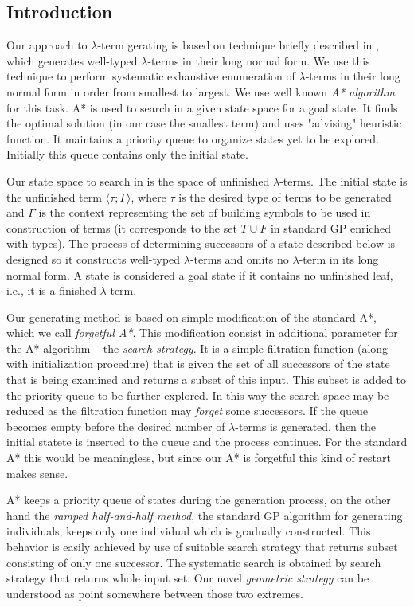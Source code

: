 \documentclass[conference]{IEEEtran}
\newcommand{\lterm}{$\lambda$-term\xspace}
\newcommand{\lterms}{$\lambda$-terms\xspace}
\newcommand{\ul}[2]{\langle #1 ; #2 \rangle}
\begin{document}
\subsection{Introduction}

Our approach to \lterm gerating is based on technique 
briefly described in \cite{barendregt10}, which generates
well-typed \lterms in their long normal form. 
We use this technique to perform systematic exhaustive enumeration
of \lterms in their long normal form in order from smallest to largest.
We use well known \textit{A* algorithm} \cite{AIMA} for this task.
A* is used to search in a given state space for a goal state. 
It finds the optimal solution (in our case the smallest term)
and uses "advising" heuristic function.
It maintains a priority queue to organize states yet to be explored.
Initially this queue contains only the initial state.  

Our state space to search in is the space of unfinished \lterms. 
The initial state is the unfinished term $\ul{\tau}{\Gamma}$, 
where $\tau$ is the desired type of
terms to be generated and $\Gamma$ is the context
representing the set of building symbols to be used in construction of
terms (it corresponds to the set $T \cup F$ in
standard GP enriched with types). The process of determining 
successors of a state described below is designed so it constructs well-typed 
\lterms and omits no \lterm in its long normal form. 
A state is considered a goal state if it contains no unfinished
leaf, i.e., it is a finished \lterm.

Our generating method is based on simple modification of the
standard A*, which we call \textit{forgetful A*}. This modification consist in 
additional parameter for the A* algorithm -- the \textit{search strategy}. 
It is a simple filtration function (along with initialization procedure)
that is given the set of all successors of the state that is being examined
and returns a subset of this input. This subset is added to the priority queue 
to be further explored. In this way the search space may be reduced as 
the filtration function may \textit{forget} some successors.
If the queue becomes empty before the desired number of \lterms
is generated, then the initial statete is inserted to the queue
and the process continues. For the standard A* this would be meaningless,
but since our A* is forgetful this kind of restart makes sense.

A* keeps a priority queue of states during the generation process,
on the other hand the \textit{ramped half-and-half method}, 
the standard GP algorithm for generating individuals, 
keeps only one individual which is gradually constructed. This 
behavior is easily achieved by use of suitable search strategy 
that returns subset consisting of only one successor.
The systematic search is obtained by search strategy that 
returns whole input set.      
Our novel \textit{geometric strategy} can be understood as
point somewhere between those two extremes.
\end{document}
